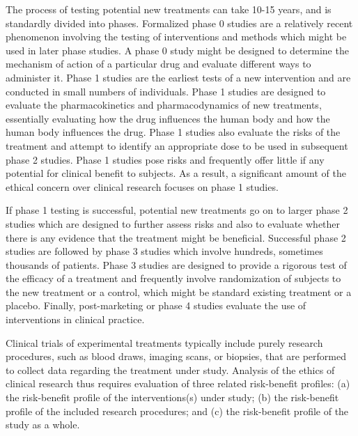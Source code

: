 \documentclass[12p]{article}
\begin{document}
The process of testing potential new treatments can take 10-15 years, and is standardly divided into phases. Formalized phase 0 studies are a relatively recent phenomenon involving the testing of interventions and methods which might be used in later phase studies. A phase 0 study might be designed to determine the mechanism of action of a particular drug and evaluate different ways to administer it. Phase 1 studies are the earliest tests of a new intervention and are conducted in small numbers of individuals. Phase 1 studies are designed to evaluate the pharmacokinetics and pharmacodynamics of new treatments, essentially evaluating how the drug influences the human body and how the human body influences the drug. Phase 1 studies also evaluate the risks of the treatment and attempt to identify an appropriate dose to be used in subsequent phase 2 studies. Phase 1 studies pose risks and frequently offer little if any potential for clinical benefit to subjects. As a result, a significant amount of the ethical concern over clinical research focuses on phase 1 studies.

If phase 1 testing is successful, potential new treatments go on to larger phase 2 studies which are designed to further assess risks and also to evaluate whether there is any evidence that the treatment might be beneficial. Successful phase 2 studies are followed by phase 3 studies which involve hundreds, sometimes thousands of patients. Phase 3 studies are designed to provide a rigorous test of the efficacy of a treatment and frequently involve randomization of subjects to the new treatment or a control, which might be standard existing treatment or a placebo. Finally, post-marketing or phase 4 studies evaluate the use of interventions in clinical practice.

Clinical trials of experimental treatments typically include purely research procedures, such as blood draws, imaging scans, or biopsies, that are performed to collect data regarding the treatment under study. Analysis of the ethics of clinical research thus requires evaluation of three related risk-benefit profiles: (a) the risk-benefit profile of the interventions(s) under study; (b) the risk-benefit profile of the included research procedures; and (c) the risk-benefit profile of the study as a whole.
\end{document}
